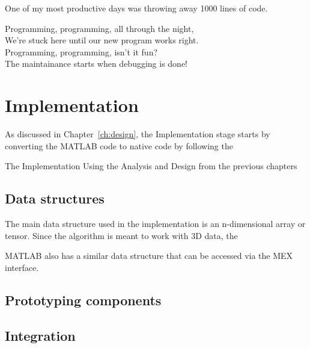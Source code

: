 
\begin{savequote}[0.55\linewidth]
	\begin{fancyquote}
	One of my most productive days was throwing away 1000 lines of code.
	\end{fancyquote}
	\begin{fancyquote}
		Programming, programming, all through the night,\\
		We're stuck here until our new program works right.\\
		Programming, programming, isn't it fun?\\
		The maintainance starts when debugging is done!
	\end{fancyquote}
\end{savequote}
\chapter{Implementation}\label{ch:implementation}

As discussed in Chapter~\ref{ch:design}, the Implementation stage
starts by converting the MATLAB code to native code by following
the 

The Implementation
Using the Analysis and Design from the previous chapters

\section{Data structures}

The main data structure used in the implementation is an
n-dimensional array or tensor. Since the algorithm is meant to
work with 3D data, the 

MATLAB also has a similar data structure that can be accessed via the MEX interface.

\section{Prototyping components}

\section{Integration}


